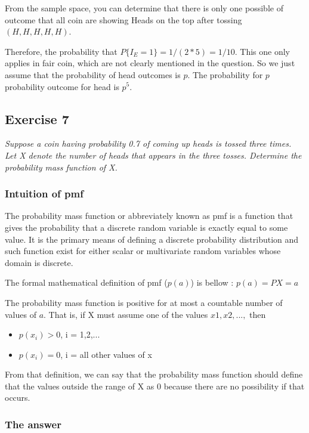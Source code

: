 \documentclass[12pt,a4paper]{article}
\begin{document}
From the sample space, you can determine that there is only one possible of outcome that all coin are showing Heads on the top after tossing $(H,H,H,H,H)$.

Therefore, the probability that $P\{I_E = 1\} = 1/(2*5) = 1/10$. This one only applies in fair coin, which are not clearly mentioned in the question. So we just assume that the probability of head outcomes is $p$. The probability for $p$ probability outcome for head is $p^5$.


\subsection{Exercise 7}

\textit{Suppose a coin having probability 0.7 of coming up heads is tossed three times. Let X denote the number of heads that appears in the three tosses. Determine the probability mass function of X.}


\subsubsection{Intuition of pmf}

The probability mass function or abbreviately known as pmf is a function that gives the probability that a discrete random variable is exactly equal to some value. It is the primary means of defining a discrete probability distribution and such function exist for either scalar or multivariate random variables whose domain is discrete.

The formal mathematical definition of pmf ($p(a)$) is bellow :
$ p(a) = P{X = a} $

The probability mass function is positive for at most a countable number of values of $a$. That is, if X must assume one of the values $x1,x2,...,$ then

\begin{itemize}
	\item $p(x_i) > 0$, i = 1,2,...
	\item $p(x_i) = 0$, i = all other values of x
\end{itemize}

From that definition, we can say that the probability mass function should define that the values outside the range of X as 0 because there are no possibility if that occurs.



\subsubsection{The answer}
\end{document}
